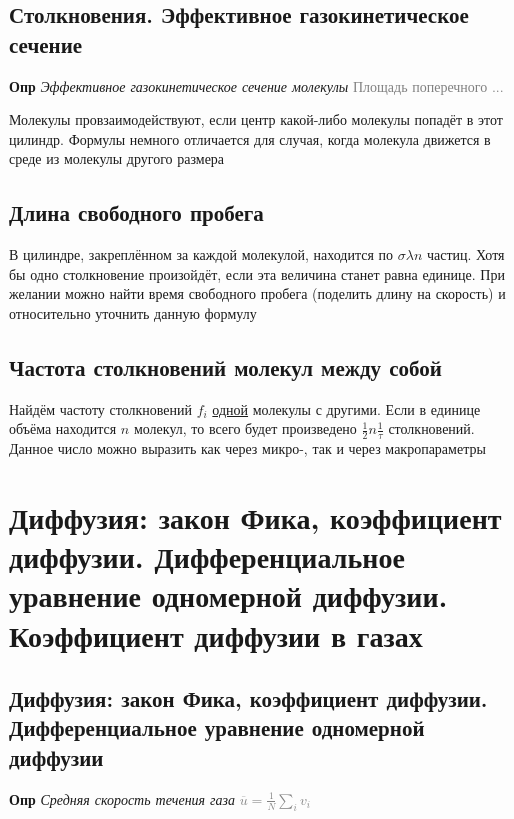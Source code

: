 \documentclass[a4paper, 14pt]{article}
\begin{document}
    \subsection{Столкновения. Эффективное газокинетическое сечение}
    
    \textbf{Опр} \textit{Эффективное газокинетическое сечение молекулы} \textcolor{gray}{Площадь поперечного ...}
    
    Молекулы провзаимодействуют, если центр какой-либо молекулы попадёт в этот цилиндр.
    Формулы немного отличается для случая, когда молекула движется в среде из молекулы другого размера
    
    \subsection{Длина свободного пробега}
    
    В цилиндре, закреплённом за каждой молекулой, находится по $\sigma \lambda n$ частиц.
    Хотя бы одно столкновение произойдёт, если эта величина станет равна единице.
    При желании можно найти время свободного пробега (поделить длину на скорость) и относительно уточнить данную формулу
    
    \subsection{Частота столкновений молекул между собой}
    
    Найдём частоту столкновений $f_i$ \underline{одной} молекулы с другими.
    Если в единице объёма находится $n$ молекул, то всего будет произведено $\frac{1}{2}n \frac{1}{\tau}$ столкновений.
    Данное число можно выразить как через микро-, так и через макропараметры
    
    \section{Диффузия: закон Фика, коэффициент диффузии. Дифференциальное уравнение одномерной диффузии.
    Коэффициент диффузии в газах}
    
    \subsection{Диффузия: закон Фика, коэффициент диффузии. Дифференциальное уравнение одномерной диффузии}
    
    \textbf{Опр} \textit{Средняя скорость течения газа} \textcolor{gray}{$\overline{u} = \frac{1}{N} \sum_i v_i$}
    
\end{document}
